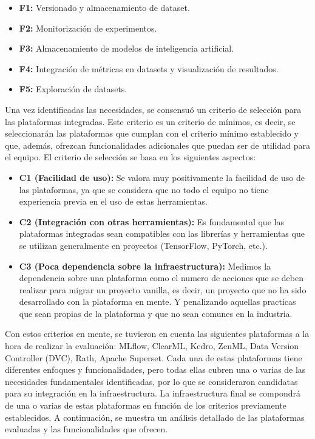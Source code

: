 \begin{itemize}
    \item \textbf{F1:} Versionado y almacenamiento de dataset.
    \item \textbf{F2:} Monitorización de experimentos.
    \item \textbf{F3:} Almacenamiento de modelos de inteligencia artificial.
    \item \textbf{F4:} Integración de métricas en datasets y visualización de resultados.
    \item \textbf{F5:} Exploración de datasets.
\end{itemize}

Una vez identificadas las necesidades, se consensuó un criterio de selección
para las plataformas integradas. Este criterio es un criterio de mínimos, es
decir, se seleccionarán las plataformas que cumplan con el criterio mínimo
establecido y que, además, ofrezcan funcionalidades adicionales que puedan
ser de utilidad para el equipo. El criterio de selección se basa en los
siguientes aspectos: 

\begin{itemize}
    \item \textbf{C1 (Facilidad de uso):} Se valora muy positivamente la facilidad de uso de las
    plataformas, ya que se considera que no todo el equipo no tiene experiencia
    previa en el uso de estas herramientas.
    \item \textbf{C2 (Integración con otras herramientas):} Es fundamental que las
    plataformas integradas sean compatibles con las librerías y herramientas
    que se utilizan generalmente en proyectos (TensorFlow, PyTorch, etc.).
    \item \textbf{C3 (Poca dependencia sobre la infraestructura):} Medimos la dependencia
    sobre una plataforma como el numero de acciones que se deben realizar para
    migrar un proyecto vanilla, es decir, un proyecto que no ha sido
    desarrollado con la plataforma en mente. Y penalizando aquellas practicas
    que sean propias de la plataforma y que no sean comunes en la industria.
\end{itemize}

Con estos criterios en mente, se tuvieron en cuenta las siguientes
plataformas a la hora de realizar la evaluación: MLflow, ClearML, Kedro, ZenML, Data Version Controller (DVC),
Rath, Apache Superset. Cada una de estas plataformas tiene diferentes enfoques y 
funcionalidades, pero todas ellas cubren una o varias de las necesidades fundamentales
identificadas, por lo que se consideraron candidatas para su integración en la
infraestructura. La infraestructura final se compondrá de una o varias de estas
plataformas en función de los criterios previamente establecidos. A continuación, se 
muestra un análisis detallado de las plataformas evaluadas y las funcionalidades que ofrecen.


